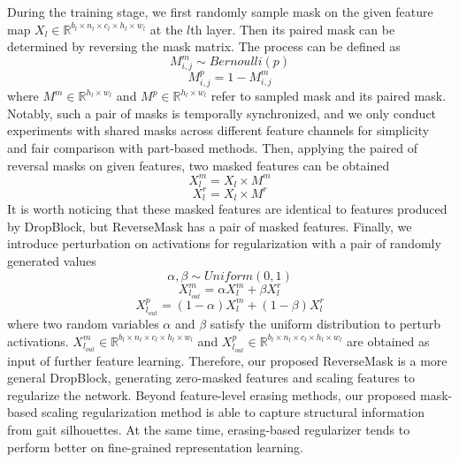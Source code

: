 \documentclass[runningheads]{llncs}
\begin{document}
    During the training stage, we first randomly sample mask on the given feature map $X_l\in\mathbb{R}^{ b_l \times n_l \times c_l \times h_l \times w_l}$ at the $l$th layer. Then its paired mask can be determined by reversing the mask matrix. The process can be defined as
        \begin{equation}
            \label{eq:reversemask}
         \mathit M^{m}_{i,j} \sim  Bernoulli(p)
        \end{equation}
        \begin{equation}
        \label{eq:reversemask_p}
         \mathit M^{p}_{i,j} = 1 - M^{m}_{i,j} 
        \end{equation}
    where $M^m\in\mathbb{R}^{ h_l \times w_l}$ and $M^p\in\mathbb{R}^{ h_l \times w_l}$ refer to sampled mask and its paired mask. Notably, such a pair of masks is temporally synchronized, and we only conduct experiments with shared masks across different feature channels for simplicity and fair comparison with part-based methods. Then, applying the paired of reversal masks on given features, two masked features can be obtained
        \begin{equation}
         \mathit X^m_l = X_l \times M^m
        \end{equation}
        \begin{equation}
         \mathit X^r_l = X_l \times M^r
        \end{equation}
    It is worth noticing that these masked features are identical to features produced by DropBlock, but ReverseMask has a pair of masked features. Finally, we introduce perturbation on activations for regularization with a pair of randomly generated values
            \begin{equation}
         \mathit \alpha,\beta \sim  Uniform(0,1)
        \end{equation}
        \begin{equation}
                    \label{eq:featmask}
         \mathit X^{m}_{l_{out}} = \alpha X^m_l + \beta X^r_l
        \end{equation}
        \begin{equation}
                     \label{eq:featpaired}
         \mathit X^{p}_{l_{out}} = (1-\alpha) X^m_l + (1-\beta) X^r_l
        \end{equation}
    where two random variables $\alpha$ and $\beta$ satisfy the uniform distribution to perturb activations. $X^{m}_{l_{out}}\in\mathbb{R}^{ b_l \times n_l \times c_l \times h_l \times w_l}$ and $X^{p}_{l_{out}}\in\mathbb{R}^{ b_l \times n_l \times c_l \times h_l \times w_l}$ are obtained as input of further feature learning.
    Therefore, our proposed ReverseMask is a more general DropBlock, generating zero-masked features and scaling features to regularize the network. Beyond feature-level erasing methods, our proposed mask-based scaling regularization method is able to capture structural information from gait silhouettes. At the same time, erasing-based regularizer tends to perform better on fine-grained representation learning.
\end{document}
